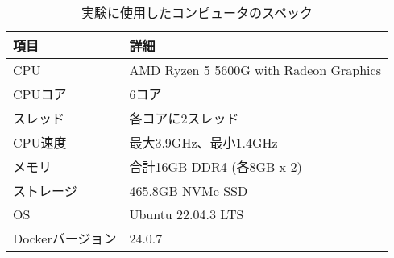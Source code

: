 \documentclass[../../../../main]{subfiles}
\begin{document}
    \begin{table}[htbp]
        \centering
        \caption{実験に使用したコンピュータのスペック}
        \label{tab:computer-specs}
        \begin{tabular}{|l|l|}
            \hline
            \textbf{項目} & \textbf{詳細}                            \\ \hline
            CPU         & AMD Ryzen 5 5600G with Radeon Graphics \\ \hline
            CPUコア       & 6コア                                    \\ \hline
            スレッド        & 各コアに2スレッド                              \\ \hline
            CPU速度       & 最大3.9GHz、最小1.4GHz                      \\ \hline
            メモリ         & 合計16GB DDR4 (各8GB x 2)                 \\ \hline
            ストレージ       & 465.8GB NVMe SSD                       \\ \hline
            OS          & Ubuntu 22.04.3 LTS                     \\ \hline
            Dockerバージョン & 24.0.7                                 \\ \hline
        \end{tabular}
    \end{table}
\end{document}
